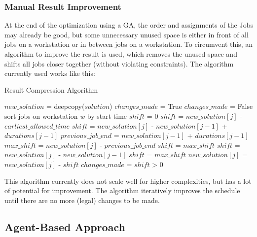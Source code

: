 \documentclass[a4paper,12pt,twoside]{scrreprt}
\begin{document}
\begin{flushleft}
\subsubsection{Manual Result Improvement}
At the end of the optimization using a GA, the order and assignments of the Jobs may already be good, but some unnecessary unused space is either in front of all jobs on a workstation or in between jobs on a workstation. To circumvent this, an algorithm to improve the result is used, which removes the unused space and shifts all jobs closer together (without violating constraints).
The algorithm currently used works like this:
\begin{algorithm}[H]
	\label{Result Compression Algorithm}
	\caption{Result Compression Algorithm}
\begin{algorithmic}
	\STATE $new\_solution$ = deepcopy($solution$)
	\STATE $changes\_made$ = True
		\STATE $changes\_made$ = False
			\STATE sort jobs on workstation $w$ by start time
					\STATE $shift$ = 0
						\STATE $shift$ = $new\_solution[j]$ - $earliest\_allowed\_time$
					\ELSE
						\STATE $shift$ = $new\_solution[j]$ - $new\_solution[j-1]$ + $durations[j-1]$
					\ENDIF
				\ELSE
					\STATE $previous\_job\_end$ = $new\_solution[j-1]$ + $durations[j-1]$
					\STATE $max\_shift$ = $new\_solution[j]$ - $previous\_job\_end$
						\STATE $shift$ = $max\_shift$
					\ELSE
						\STATE $shift$ = $new\_solution[j]$ - $new\_solution[j-1]$
							\STATE $shift$ = $max\_shift$
						\ENDIF
					\ENDIF
				\ENDIF
				\STATE $new\_solution[j]$ = $new\_solution[j]$ - $shift$
				\STATE $changes\_made$ = $shift$ > 0
			\ENDFOR
		\ENDFOR
	\ENDWHILE
\end{algorithmic}
\end{algorithm}
This algorithm currently does not scale well for higher complexities, but has a lot of potential for improvement.
The algorithm iteratively improves the schedule until there are no more (legal) changes to be made.

\subsection{Agent-Based Approach}


\end{flushleft}
\end{document}
